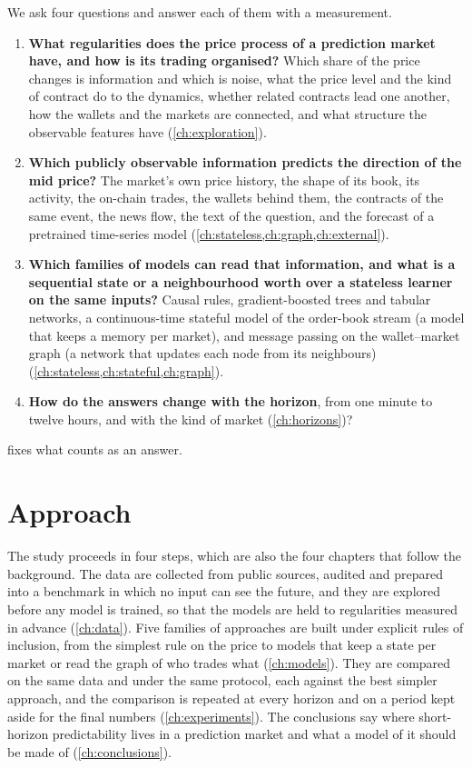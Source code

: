 We ask four questions and answer each of them with a measurement.

\begin{enumerate}[nosep,label=\textbf{Q\arabic*},ref=Q\arabic*]
  \item \label{q:process} \textbf{What regularities does the price process of a prediction
  market have, and how is its trading organised?}  Which share of the price changes is
  information and which is noise, what the price level and the kind of contract do to the
  dynamics, whether related contracts lead one another, how the wallets and the markets are
  connected, and what structure the observable features have (\cref{ch:exploration}).
  \item \label{q:information} \textbf{Which publicly observable information predicts the
  direction of the mid price?}  The market's own price history, the shape of its book, its
  activity, the on-chain trades, the wallets behind them, the contracts of the same event,
  the news flow, the text of the question, and the forecast of a pretrained time-series
  model (\cref{ch:stateless,ch:graph,ch:external}).
  \item \label{q:models} \textbf{Which families of models can read that information, and
  what is a sequential state or a neighbourhood worth over a stateless learner on the same
  inputs?}  Causal rules, gradient-boosted trees and tabular networks, a continuous-time
  stateful model of the order-book stream (a model that keeps a memory per market), and
  message passing on the wallet--market graph (a network that updates each node from its
  neighbours) (\cref{ch:stateless,ch:stateful,ch:graph}).
  \item \label{q:horizon} \textbf{How do the answers change with the horizon}, from one
  minute to twelve hours, and with the kind of market (\cref{ch:horizons})?
\end{enumerate}

 fixes what counts as an answer.

\section{Approach}
\label{sec:intro:approach}

The study proceeds in four steps, which are also the four chapters that follow the
background.  The data are
collected from public sources, audited and prepared into a benchmark in which no input can
see the future, and they are explored before any model is trained, so that the models are
held to regularities measured in advance (\cref{ch:data}).  Five families of approaches are
built under explicit rules of inclusion, from the simplest rule on the price to models that
keep a state per market or read the graph of who trades what (\cref{ch:models}).  They are
compared on the same data and under the same protocol, each against the best simpler
approach, and the comparison is repeated at every horizon and on a period kept aside for
the final numbers (\cref{ch:experiments}).  The conclusions say where short-horizon
predictability lives in a prediction market and what a model of it should be made of
(\cref{ch:conclusions}).

